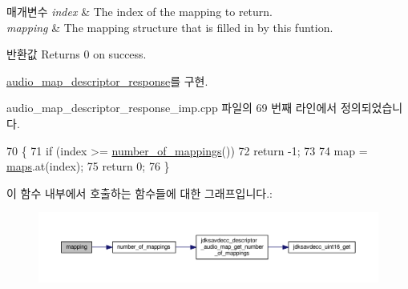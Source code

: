 \begin{DoxyParams}{매개변수}
{\em index} & The index of the mapping to return. \\
\hline
{\em mapping} & The mapping structure that is filled in by this funtion. \\
\hline
\end{DoxyParams}
\begin{DoxyReturn}{반환값}
Returns 0 on success. 
\end{DoxyReturn}


\hyperlink{classavdecc__lib_1_1audio__map__descriptor__response_a5f6a0ccf54636fda2d718efab6b4abae}{audio\+\_\+map\+\_\+descriptor\+\_\+response}를 구현.



audio\+\_\+map\+\_\+descriptor\+\_\+response\+\_\+imp.\+cpp 파일의 69 번째 라인에서 정의되었습니다.


\begin{DoxyCode}
70 \{
71     \textcolor{keywordflow}{if} (index >= \hyperlink{classavdecc__lib_1_1audio__map__descriptor__response__imp_ae2bf500862519a98450af5a447a1529d}{number\_of\_mappings}())
72         \textcolor{keywordflow}{return} -1;
73 
74     map = \hyperlink{classavdecc__lib_1_1audio__map__descriptor__response__imp_abab36d4d2ed4dc7caed24d72f0806a83}{maps}.at(index);
75     \textcolor{keywordflow}{return} 0;
76 \}
\end{DoxyCode}


이 함수 내부에서 호출하는 함수들에 대한 그래프입니다.\+:
\nopagebreak
\begin{figure}[H]
\begin{center}
\leavevmode
\includegraphics[width=350pt]{classavdecc__lib_1_1audio__map__descriptor__response__imp_a6a825a7fda7f566a7914ed0eb495b82c_cgraph}
\end{center}
\end{figure}


